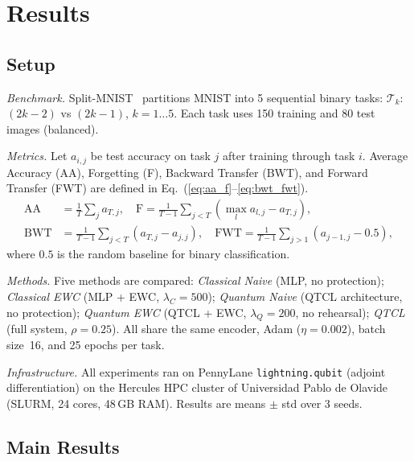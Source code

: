 \documentclass{llncs}
\begin{document}
\section{Results}
\label{sec:experiments}

\subsection{Setup}
\label{subsec:setup}

\noindent\textit{Benchmark.}
Split-MNIST~\cite{lecun1998,zenke2017continual} partitions MNIST into 5
sequential binary tasks: $\mathcal{T}_k$: $(2k{-}2)$ vs $(2k{-}1)$, $k=1\ldots5$.
Each task uses 150 training and 80 test images (balanced).

\noindent\textit{Metrics.}
Let $a_{i,j}$ be test accuracy on task $j$ after training through task $i$.
Average Accuracy (AA), Forgetting (F), Backward Transfer (BWT), and Forward
Transfer (FWT) are defined in Eq.~(\ref{eq:aa_f}--\ref{eq:bwt_fwt}).
\begin{align}
  \mathrm{AA}  &= \tfrac{1}{T}\textstyle\sum_j a_{T,j}, \quad
  \mathrm{F}   = \tfrac{1}{T-1}\textstyle\sum_{j<T}(\max_l a_{l,j}-a_{T,j}),
  \label{eq:aa_f}\\
  \mathrm{BWT} &= \tfrac{1}{T-1}\textstyle\sum_{j<T}(a_{T,j}-a_{j,j}), \quad
  \mathrm{FWT} = \tfrac{1}{T-1}\textstyle\sum_{j>1}(a_{j-1,j}-0.5),
  \label{eq:bwt_fwt}
\end{align}
where $0.5$ is the random baseline for binary classification.

\noindent\textit{Methods.}
Five methods are compared:
\textit{Classical Naive} (MLP, no protection);
\textit{Classical EWC} (MLP + EWC, $\lambda_C=500$);
\textit{Quantum Naive} (QTCL architecture, no protection);
\textit{Quantum EWC} (QTCL + EWC, $\lambda_Q=200$, no rehearsal);
\textit{QTCL} (full system, $\rho=0.25$).
All share the same encoder, Adam ($\eta=0.002$), batch size~16, and 25 epochs
per task.

\noindent\textit{Infrastructure.}
All experiments ran on PennyLane \texttt{lightning.qubit} (adjoint
differentiation) on the Hercules HPC cluster of Universidad Pablo de Olavide
(SLURM, 24 cores, 48\,GB RAM).
Results are means $\pm$ std over 3 seeds.

\subsection{Main Results}
\label{subsec:discussion}
\end{document}
